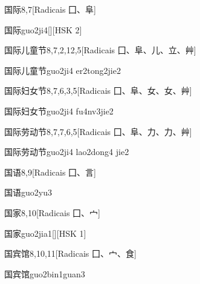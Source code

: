 \begin{entry}{国际}{8,7}[Radicais ⼞、⾩]
  \begin{phonetics}{国际}{guo2ji4}[][HSK 2]
  \end{phonetics}
\end{entry}

\begin{entry}{国际儿童节}{8,7,2,12,5}[Radicais ⼞、⾩、⼉、⽴、⾋]
  \begin{phonetics}{国际儿童节}{guo2ji4 er2tong2jie2}
  \end{phonetics}
\end{entry}

\begin{entry}{国际妇女节}{8,7,6,3,5}[Radicais ⼞、⾩、⼥、⼥、⾋]
  \begin{phonetics}{国际妇女节}{guo2ji4 fu4nv3jie2}
  \end{phonetics}
\end{entry}

\begin{entry}{国际劳动节}{8,7,7,6,5}[Radicais ⼞、⾩、⼒、⼒、⾋]
  \begin{phonetics}{国际劳动节}{guo2ji4 lao2dong4 jie2}
  \end{phonetics}
\end{entry}

\begin{entry}{国语}{8,9}[Radicais ⼞、⾔]
  \begin{phonetics}{国语}{guo2yu3}
  \end{phonetics}
\end{entry}

\begin{entry}{国家}{8,10}[Radicais ⼞、⼧]
  \begin{phonetics}{国家}{guo2jia1}[][HSK 1]
  \end{phonetics}
\end{entry}

\begin{entry}{国宾馆}{8,10,11}[Radicais ⼞、⼧、⾷]
  \begin{phonetics}{国宾馆}{guo2bin1guan3}
  \end{phonetics}
\end{entry}

